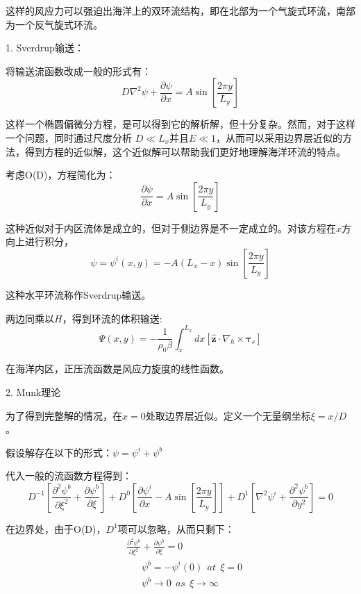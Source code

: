 \documentclass{article}
\begin{document}
这样的风应力可以强迫出海洋上的双环流结构，即在北部为一个气旋式环流，南部为一个反气旋式环流。

1. Sverdrup输送：

将输送流函数改成一般的形式有：
$$D{{\nabla }^{2}}\psi +\frac{\partial \psi }{\partial x}=A\sin \left[ \frac{2\pi y}{{{L}_{y}}}\right] $$

这样一个椭圆偏微分方程，是可以得到它的解析解，但十分复杂。然而，对于这样一个问题，同时通过尺度分析 $D \ll L_x$并且$E \ll 1$，从而可以采用边界层近似的方法，得到方程的近似解，这个近似解可以帮助我们更好地理解海洋环流的特点。

考虑O(D)，方程简化为：
$$\frac{\partial \psi }{\partial x}=A\sin \left[ \frac{2\pi y}{{{L}_{y}}} \right]$$

这种近似对于内区流体是成立的，但对于侧边界是不一定成立的。对该方程在$x$方向上进行积分，
$$\psi ={{\psi }^{i}}\left( x,y \right)=-A({{L}_{x}}-x)\sin \left[ \frac{2\pi y}{{{L}_{y}}} \right]$$

这种水平环流称作Sverdrup输送。

两边同乘以$H$，得到环流的体积输送:
$$\Psi \left( x,y \right)=-\frac{1}{{{\rho }_{0}}\beta }\int_{x}^{{{L}_{x}}}{dx\left[ \mathbf{\hat{z}}\cdot {{\nabla }_{h}}\times {{\mathbf{\tau }}_{s}} \right]}$$

在海洋内区，正压流函数是风应力旋度的线性函数。

2. Munk理论

为了得到完整解的情况，在$x=0$处取边界层近似。定义一个无量纲坐标$\xi=x/D$。

假设解存在以下的形式：$\psi = \psi^i +\psi^b$

代入一般的流函数方程得到：
$${{D}^{-1}}\left[ \frac{{{\partial }^{2}}{{\psi }^{b}}}{\partial {{\xi }^{2}}}+\frac{\partial {{\psi }^{b}}}{\partial \xi } \right]+{{D}^{0}}\left[ \frac{\partial {{\psi }^{i}}}{\partial x}-A\sin \left[ \frac{2\pi y}{{{L}_{y}}} \right] \right]+{{D}^{1}}\left[ {{\nabla }^{2}}{{\psi }^{i}}+\frac{{{\partial }^{2}}{{\psi }^{b}}}{\partial {{y}^{2}}} \right]=0$$

在边界处，由于O(D)，$D^1$项可以忽略，从而只剩下：
\begin{align}
  & \frac{{{\partial }^{2}}{{\psi }^{b}}}{\partial {{\xi }^{2}}}+\frac{\partial {{\psi }^{b}}}{\partial \xi }=0 \\ 
 & \ \ \ \ \ \ \ {{\psi }^{b}}=-{{\psi }^{i}}(0)\ \ at\ \ \xi =0 \\ 
 & \ \ \ \ \ \ \ {{\psi }^{b}}\to 0\ \ as\ \ \xi \to \infty \ \ \ \  
\end{align}
\end{document}
